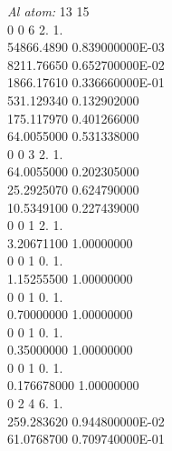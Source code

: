\documentclass[11pt,DIV=13,BCOR=5mm,a4paper,headinclude]{scrbook}
\begin{document}
\begin{spacing}{0.5}
{\tiny \textit{Al atom: }
13 15\\
0 0 6 2. 1.\\
     
     54866.4890         0.839000000E-03\\
     
       8211.76650         0.652700000E-02\\
       
       1866.17610         0.336660000E-01\\
       
       531.129340         0.132902000\\
       
       175.117970         0.401266000\\
       
       64.0055000         0.531338000\\
0 0 3 2. 1.\\

       64.0055000         0.202305000\\
       
       25.2925070         0.624790000\\
       
       10.5349100         0.227439000\\
0 0 1 2. 1.\\

       3.20671100          1.00000000\\
0 0 1 0. 1.\\

       1.15255500          1.00000000\\
0 0 1 0. 1.\\

       0.70000000          1.00000000\\
0 0 1 0. 1.\\

       0.35000000          1.00000000\\
0 0 1 0. 1.\\

      0.176678000          1.00000000\\
0 2 4 6. 1.\\

       259.283620         0.944800000E-02\\

       61.0768700         0.709740000E-01\\
       
}
\end{spacing}
\end{document}
